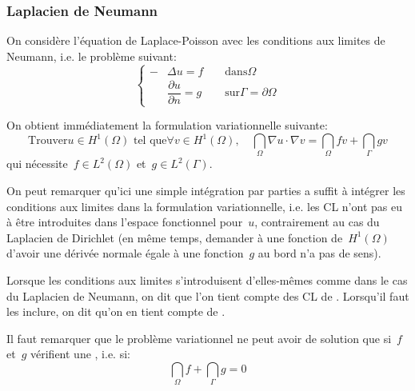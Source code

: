\medskip
\subsubsection{Laplacien de Neumann}
On considère l'équation de Laplace-Poisson avec les conditions aux limites de Neumann,
i.e. le problème suivant:
\begin{equation}\left\{\begin{aligned}
-&\Delta u=f &&\text{ dans} \Omega\\
&\dfrac{\partial u}{\partial n}=g &&\text{ sur} \Gamma=\partial\Omega
\end{aligned}
\right.
\end{equation}

\medskip
On obtient immédiatement la formulation variationnelle suivante:
\begin{equation}
\text{Trouver}u\in H^1(\Omega) \text{ tel que}
\forall v\in H^1(\Omega),\quad \dint_\Omega \nabla u\cdot\nabla v = \dint_\Omega fv + \dint_\Gamma gv
\end{equation}
qui nécessite~$f\in L^2(\Omega)$ et~$g\in L^2(\Gamma)$.

\medskip
On peut remarquer qu'ici une simple intégration par parties a suffit à intégrer les conditions aux
limites dans la formulation variationnelle, i.e. les CL n'ont pas eu à être introduites
dans l'espace fonctionnel pour~$u$, contrairement au cas du Laplacien de Dirichlet
(en même temps, demander à une fonction de~$H^1(\Omega)$ d'avoir une dérivée
normale égale à une fonction~$g$ au bord n'a pas de sens).

Lorsque les conditions aux limites s'introduisent d'elles-mêmes comme dans
le cas du Laplacien de Neumann, on dit que l'on tient compte des CL de
. Lorsqu'il faut les inclure, on dit qu'on en tient
compte de .

\medskip
Il faut remarquer que le problème variationnel ne peut avoir de solution que
si~$f$ et~$g$ vérifient une , i.e. si:
\begin{equation}
\dint_\Omega f + \dint_\Gamma g = 0
\end{equation}

